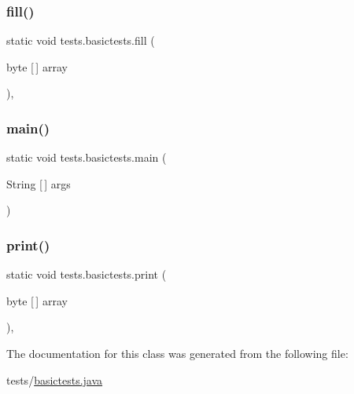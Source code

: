 \subsubsection{\texorpdfstring{fill()}{fill()}}
{\footnotesize\ttfamily static void tests.\+basictests.\+fill (\begin{DoxyParamCaption}\item[{byte \mbox{[}$\,$\mbox{]}}]{array }\end{DoxyParamCaption})\hspace{0.3cm}{\ttfamily [static]}, {\ttfamily [private]}}

\mbox{\label{classtests_1_1basictests_a8c2ad51be644e7e21d5d8fb8b78e8333}} 
\subsubsection{\texorpdfstring{main()}{main()}}
{\footnotesize\ttfamily static void tests.\+basictests.\+main (\begin{DoxyParamCaption}\item[{String \mbox{[}$\,$\mbox{]}}]{args }\end{DoxyParamCaption})\hspace{0.3cm}{\ttfamily [static]}}

\mbox{\label{classtests_1_1basictests_a99ff70815545eb9d06d865a4b64f7e8d}} 
\subsubsection{\texorpdfstring{print()}{print()}}
{\footnotesize\ttfamily static void tests.\+basictests.\+print (\begin{DoxyParamCaption}\item[{byte \mbox{[}$\,$\mbox{]}}]{array }\end{DoxyParamCaption})\hspace{0.3cm}{\ttfamily [static]}, {\ttfamily [private]}}



The documentation for this class was generated from the following file\+:\begin{DoxyCompactItemize}
\item 
tests/\mbox{\hyperlink{basictests_8java}{basictests.\+java}}\end{DoxyCompactItemize}
